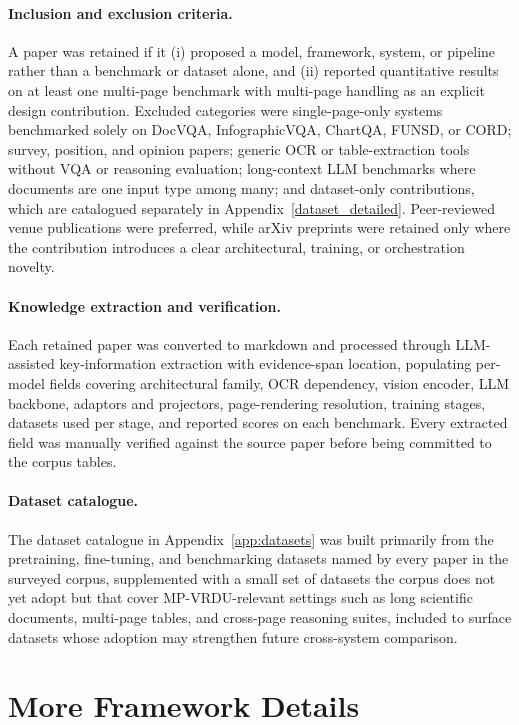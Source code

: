 \documentclass[11pt]{article}
\begin{document}
\paragraph{Inclusion and exclusion criteria.}
A paper was retained if it (i) proposed a model, framework, system, or pipeline rather than a benchmark or dataset alone, and (ii) reported quantitative results on at least one multi-page benchmark with multi-page handling as an explicit design contribution. Excluded categories were single-page-only systems benchmarked solely on DocVQA, InfographicVQA, ChartQA, FUNSD, or CORD; survey, position, and opinion papers; generic OCR or table-extraction tools without VQA or reasoning evaluation; long-context LLM benchmarks where documents are one input type among many; and dataset-only contributions, which are catalogued separately in Appendix~\ref{dataset_detailed}. Peer-reviewed venue publications were preferred, while arXiv preprints were retained only where the contribution introduces a clear architectural, training, or orchestration novelty.

\paragraph{Knowledge extraction and verification.}
Each retained paper was converted to markdown and processed through LLM-assisted key-information extraction with evidence-span location, populating per-model fields covering architectural family, OCR dependency, vision encoder, LLM backbone, adaptors and projectors, page-rendering resolution, training stages, datasets used per stage, and reported scores on each benchmark. Every extracted field was manually verified against the source paper before being committed to the corpus tables.

\paragraph{Dataset catalogue.}
The dataset catalogue in Appendix~\ref{app:datasets} was built primarily from the pretraining, fine-tuning, and benchmarking datasets named by every paper in the surveyed corpus, supplemented with a small set of datasets the corpus does not yet adopt but that cover MP-VRDU-relevant settings such as long scientific documents, multi-page tables, and cross-page reasoning suites, included to surface datasets whose adoption may strengthen future cross-system comparison.

\section{More Framework Details}
\label{sec:framework-details}
\end{document}
